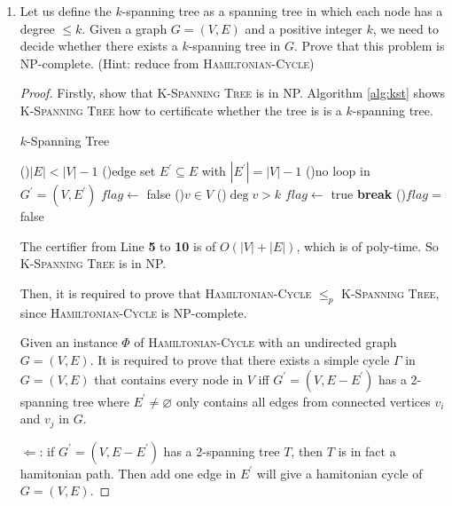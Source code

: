 \documentclass[12pt,a4paper]{article}
\theoremstyle{definition}
\begin{document}
\begin{enumerate}
\begin{proof}
    \end{proof}

    \item Let us define the $k$-spanning tree as a spanning tree in which each node has a degree $\leq k$. Given a graph $G= (V,E)$ and a positive integer $k$, we need to decide whether there exists a $k$-spanning tree in $G$. Prove that this problem is NP-complete. (Hint: reduce from \textsc{Hamiltonian-Cycle})
    
    \begin{proof}
        Firstly, show that \textsc{K-Spanning Tree} is in NP. Algorithm \ref{alg:kst} shows \textsc{K-Spanning Tree} how to certificate whether the tree is is a $k$-spanning tree.

        \begin{algorithm}[h]
            \caption{$k$-Spanning Tree}
            \label{alg:kst}
            \BlankLine
            \lIf(){$|E|<|V|-1$}{}
            \ForEach(){edge set $E^\prime\subseteq E$ with $|E^\prime|=|V|-1$}{
                \If(){no loop in $G^\prime=(V,E^\prime)$}{
                    $\mathit{flag}\leftarrow$ false\;
                    \ForEach(){$v\in V$}{
                        \If(){$\deg v>k$}{
                            $\mathit{flag}\leftarrow$ true\;
                            \textbf{break}\;
                        }
                    }
                    \lIf(){$\mathit{flag}=$false}{}
                }
            }
            \;
        \end{algorithm}
        The certifier from Line \textbf{5} to \textbf{10} is of $O(|V|+|E|)$, which is of poly-time. So \textsc{K-Spanning Tree} is in NP.

        Then, it is required to prove that \textsc{Hamiltonian-Cycle} $\leq_p$ \textsc{K-Spanning Tree}, since \textsc{Hamiltonian-Cycle} is NP-complete.

        Given an instance $\Phi$ of \textsc{Hamiltonian-Cycle} with an undirected graph $G=(V,E)$. It is required to prove that there exists a simple cycle $\Gamma$ in $G=(V,E)$ that contains every node in $V$ iff $G^\prime=(V,E-E^\prime)$ has a 2-spanning tree where $E^\prime\neq \varnothing$ only contains all edges from connected vertices $v_i$ and $v_j$ in $G$.
        
        $\Leftarrow$: if $G^\prime=(V,E-E^\prime)$ has a 2-spanning tree $T$, then $T$ is in fact a hamitonian path. Then add one edge in $E^\prime$ will give a hamitonian cycle of $G=(V,E)$.


\end{proof}
\end{enumerate}
\end{document}
